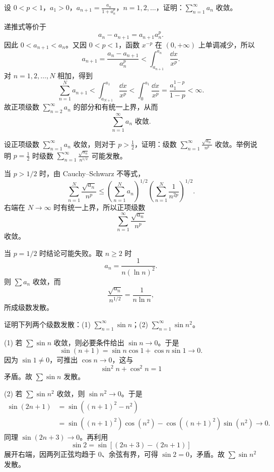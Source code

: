 \begin{xreferenceproblem}[15]
设 $0<p<1$，$a_1>0$，$a_{n+1}=\frac{a_n}{1+a_n^p}$，$n=1,2,\ldots$，证明：$\sum_{n=1}^{\infty}a_n$ 收敛。
\end{xreferenceproblem}
\begin{xsolution}
递推式等价于
\[
 a_n-a_{n+1}=a_{n+1}a_n^p.
\]
因此 $0<a_{n+1}<a_n$。又因 $0<p<1$，函数 $x^{-p}$ 在 $(0,+\infty)$ 上单调减少，所以
\[
 a_{n+1}
 =\frac{a_n-a_{n+1}}{a_n^p}
 <\int_{a_{n+1}}^{a_n}\frac{\dd x}{x^p}.
\]
对 $n=1,2,\ldots,N$ 相加，得到
\[
 \sum_{n=1}^{N}a_{n+1}
 <\int_{a_{N+1}}^{a_1}\frac{\dd x}{x^p}
 <\int_0^{a_1}\frac{\dd x}{x^p}
 =\frac{a_1^{1-p}}{1-p}<\infty.
\]
故正项级数 $\sum_{n=2}^{\infty}a_n$ 的部分和有统一上界，从而
\[
 \boxed{\sum_{n=1}^{\infty}a_n\text{ 收敛}.}
\]
\end{xsolution}


\begin{xreferenceproblem}[16]
设正项级数 $\sum_{n=1}^{\infty}a_n$ 收敛，则对于 $p>\frac12$，证明：级数 $\sum_{n=1}^{\infty}\frac{\sqrt{a_n}}{n^p}$ 收敛。举例说明 $p=\frac12$ 时级数 $\sum_{n=1}^{\infty}\frac{\sqrt{a_n}}{n^{1/2}}$ 可能发散。
\end{xreferenceproblem}
\begin{xsolution}
当 $p>1/2$ 时，由 Cauchy--Schwarz 不等式，
\[
 \sum_{n=1}^{N}\frac{\sqrt{a_n}}{n^p}
 \leq
 \left(\sum_{n=1}^{N}a_n\right)^{1/2}
 \left(\sum_{n=1}^{N}\frac1{n^{2p}}\right)^{1/2}.
\]
右端在 $N\to\infty$ 时有统一上界，所以正项级数
\[
 \sum_{n=1}^{\infty}\frac{\sqrt{a_n}}{n^p}
\]
收敛。

当 $p=1/2$ 时结论可能失败。取 $n\geq2$ 时
\[
 a_n=\frac1{n(\ln n)^2}.
\]
则 $\sum a_n$ 收敛，而
\[
 \frac{\sqrt{a_n}}{n^{1/2}}=\frac1{n\ln n},
\]
所成级数发散。
\end{xsolution}


\begin{xreferenceproblem}[17]
证明下列两个级数发散：(1) $\sum_{n=1}^{\infty}\sin n$；(2) $\sum_{n=1}^{\infty}\sin n^2$。
\end{xreferenceproblem}
\begin{xsolution}
(1) 若 $\sum\sin n$ 收敛，则必要条件给出 $\sin n\to0$。于是
\[
 \sin(n+1)=\sin n\cos1+\cos n\sin1\to0.
\]
因为 $\sin1\neq0$，可推出 $\cos n\to0$，这与
\[
 \sin^2n+\cos^2n=1
\]
矛盾。故 $\sum\sin n$ 发散。

(2) 若 $\sum\sin n^2$ 收敛，则 $\sin n^2\to0$。于是
\[
 \begin{aligned}
 \sin(2n+1)
 &=\sin((n+1)^2-n^2)\\
 &=\sin((n+1)^2)\cos(n^2)-\cos((n+1)^2)\sin(n^2)\to0.
\end{aligned}
\]
同理 $\sin(2n+3)\to0$。再利用
\[
 \sin2
 =\sin[(2n+3)-(2n+1)]
\]
展开右端，因两列正弦均趋于 $0$、余弦有界，可得 $\sin2=0$，矛盾。故 $\sum\sin n^2$ 发散。
\end{xsolution}


